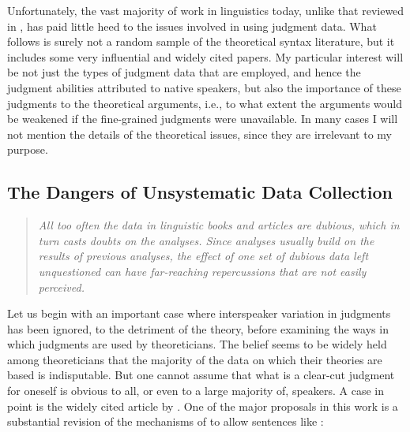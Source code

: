 Unfortunately, the vast majority of work in linguistics today, unlike that reviewed in , has paid little heed to the issues involved in using judgment data. What follows is surely not a random sample of the theoretical syntax literature, but it includes some very influential and widely cited papers. My particular interest will be not just the types of judgment data that are employed, and hence the judgment abilities attributed to native speakers, but also the importance of these judgments to the theoretical arguments, i.e., to what extent the arguments would be weakened if the fine-grained judgments were  unavailable.  In  many cases I will not mention the details of the theoretical issues, since they are irrelevant to my purpose.
 
\subsection{The Dangers of Unsystematic Data Collection} \label{sec:2.3.2}

\begin{quote}\itshape All too often the data in linguistic books and articles are dubious, which in turn casts doubts on the analyses. Since analyses usually build on the results of previous analyses, the effect of one set of dubious data left unquestioned can have far-reaching repercussions that are not easily perceived.\\[-2\baselineskip]\begin{flushright}\upshape\citep{Greenbaum1977c}\end{flushright}\end{quote}

\noindent Let us begin with an important case where interspeaker variation in judgments has been ignored, to the detriment of the theory, before examining the ways in which judgments are used by theoreticians. The belief seems to be widely held among theoreticians that the majority of the data on which their theories are based is indisputable. But one cannot assume that what is a clear-cut judgment for oneself is obvious to all, or even to a large majority of, speakers. A case in point is the widely cited article by \citet{LasnikEtAl1984}. One of the major proposals in this work is a substantial revision of the mechanisms of  to allow sentences like :

